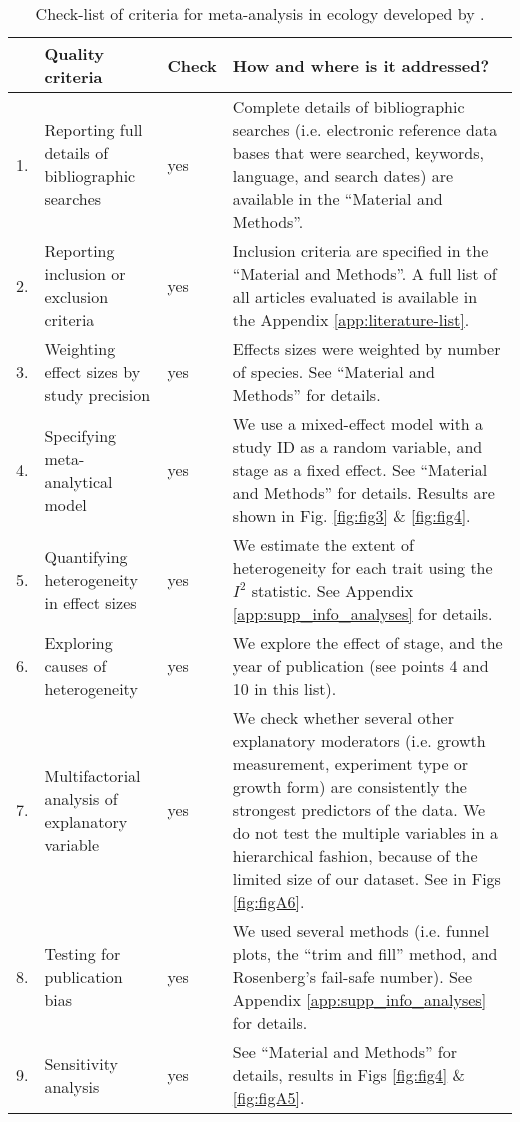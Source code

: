 \documentclass[a4paper,11pt]{article}
\begin{document}
\clearpage
\begin{table}[h!]
\centering
\caption{Check-list of criteria for meta-analysis in ecology developed by \citet{Koricheva:2014ku}.}
{\footnotesize
\vspace{0.5cm}
\begin{tabular}{p{0.2cm}p{4cm}p{0.8cm}p{7cm}}
  \hline
  & Quality criteria & Check & How and where is it addressed?\\
  \hline
  1.& Reporting full details of bibliographic searches & yes  & Complete details of bibliographic searches (i.e. electronic reference data bases that were searched, keywords, language, and search dates) are available in the ``Material and Methods''.\\
  2.& Reporting inclusion or exclusion criteria & yes & Inclusion criteria are specified in the ``Material and Methods''. A full list of all articles evaluated is available in the Appendix \ref{app:literature-list}.\\
  3.& Weighting effect sizes by study precision & yes & Effects sizes were weighted by number of species. See ``Material and Methods'' for details.\\
 4.& Specifying meta-analytical model & yes & We use a mixed-effect model with a study ID as a random variable, and stage as a fixed effect. See ``Material and Methods'' for details. Results are shown in Fig. \ref{fig:fig3} \& \ref{fig:fig4}.\\
 5.& Quantifying heterogeneity in effect sizes &  yes & We estimate the extent of heterogeneity for each trait using the $I^{2}$ statistic. See Appendix \ref{app:supp_info_analyses} for details.\\
 6.& Exploring causes of heterogeneity & yes &  We explore the effect of stage, and the year of publication (see points 4 and 10 in this list).\\
 7.& Multifactorial analysis of explanatory variable  & yes & We check whether several other explanatory moderators (i.e. growth measurement, experiment type or growth form) are consistently the strongest predictors of the data. We do not test the multiple variables in a hierarchical fashion, because of the limited size of our dataset. See in Figs \ref{fig:figA6}.\\
  8.& Testing for publication bias &  yes & We used several methods (i.e. funnel plots, the ``trim and fill'' method, and Rosenberg's fail-safe number). See Appendix \ref{app:supp_info_analyses} for details.\\
  9.& Sensitivity analysis &  yes &See ``Material and Methods'' for details, results in Figs \ref{fig:fig4} \& \ref{fig:figA5}.\\

\end{tabular}}
\end{table}
\end{document}
